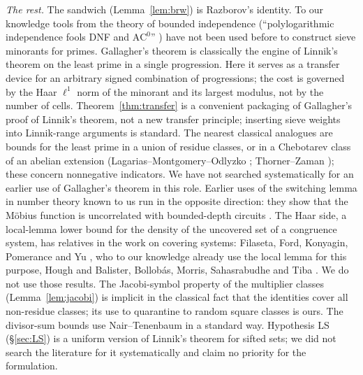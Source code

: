 \documentclass[11pt,reqno]{amsart}
\theoremstyle{definition}
\begin{document}
\emph{The rest.}  The sandwich (Lemma~\ref{lem:brw}) is Razborov's identity.
To our knowledge tools from the theory of bounded independence
(``polylogarithmic independence fools DNF and $\mathrm{AC}^0$''
\cite{Bazzi,Razborov,Braverman}) have not been used before to construct
sieve minorants for primes.  Gallagher's theorem is classically the engine of
Linnik's theorem on the least prime in a single progression.  Here it serves
as a transfer device for an arbitrary signed combination of progressions; the
cost is governed by the Haar $\ell^1$ norm of the minorant and its largest
modulus, not by the number of cells.  Theorem~\ref{thm:transfer} is a
convenient packaging of Gallagher's proof of Linnik's theorem, not a new
transfer principle; inserting sieve weights into Linnik-range arguments is
standard.  The nearest classical analogues are
bounds for the least prime in a union of residue classes, or in a Chebotarev
class of an abelian extension (Lagarias--Montgomery--Odlyzko \cite{LMO};
Thorner--Zaman \cite{TZcheb}); these concern nonnegative indicators.  We
have not searched systematically for an earlier use of Gallagher's theorem
in this role.  Earlier uses of the switching lemma in number theory known to
us run in the opposite direction: they show that the M\"obius function is
uncorrelated with bounded-depth circuits \cite{Green,Bourgain}.  The Haar
side, a local-lemma lower bound for the density of the uncovered set of a
congruence system, has relatives in the work on covering systems:
Filaseta, Ford, Konyagin, Pomerance and Yu \cite{FFKPY}, who to our knowledge
already use the local lemma for this purpose, Hough \cite{Hough} and
Balister, Bollob\'as, Morris, Sahasrabudhe and Tiba \cite{BBMST}.  We do not
use those results.  The Jacobi-symbol property of the multiplier classes
(Lemma~\ref{lem:jacobi}) is implicit in the classical fact that the
identities cover all non-residue classes; its use to quarantine to random
square classes is ours.  The divisor-sum bounds use Nair--Tenenbaum
\cite{NT,Henriot} in a standard way.  Hypothesis LS (\S\ref{sec:LS}) is a
uniform version of Linnik's theorem for sifted sets; we did not search the
literature for it systematically and claim no priority for the formulation.
\end{document}
